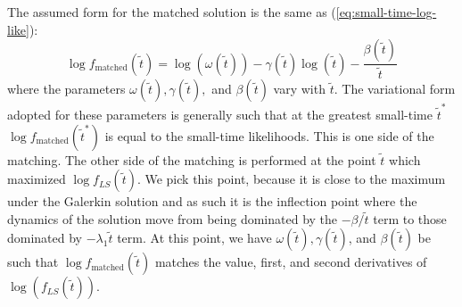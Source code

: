 The assumed form for the matched solution is the same as
(\ref{eq:small-time-log-like}):
\[
  \log f_{\mbox{matched}}(\tilde{t}) = \log(\omega(\tilde{t})) -
  \gamma(\tilde{t})\log(\tilde{t}) -
  \frac{\beta(\tilde{t})}{\tilde{t}}
\]
where the parameters $\omega(\tilde{t}), \gamma(\tilde{t}),$ and
$\beta(\tilde{t})$ vary with $\tilde{t}$. The variational form adopted
for these parameters is generally such that at the greatest small-time
$\tilde{t}^*$ $\log f_{\mbox{matched}}(\tilde{t}^*)$ is equal to the
small-time likelihoods. This is one side of the matching. The other
side of the matching is performed at the point $\tilde{t}$ which
maximized $\log f_{LS}(\tilde{t})$. We pick this point, because it is
close to the maximum under the Galerkin solution and as such it is the
inflection point where the dynamics of the solution move from being
dominated by the $-\beta/\tilde{t}$ term to those dominated by
$-\lambda_1\tilde{t}$ term. At this point, we have
$\omega(\tilde{t}), \gamma(\tilde{t})$, and $\beta(\tilde{t})$ be such
that $\log f_{\mbox{matched}}(\tilde{t})$ matches the value, first,
and second derivatives of $\log (f_{LS}(\tilde{t}))$.


